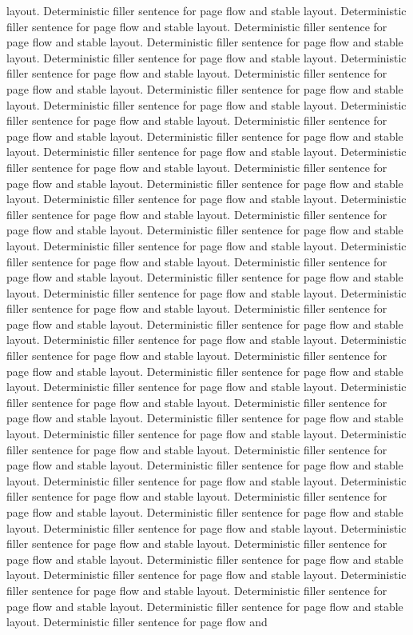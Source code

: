 \documentclass{article}
\begin{document}
layout. Deterministic filler sentence for page flow and stable layout. Deterministic filler sentence for page flow and stable layout. Deterministic filler sentence for page flow and stable layout. Deterministic filler sentence for page flow and stable layout. Deterministic filler sentence for page flow and stable layout. Deterministic filler sentence for page flow and stable layout. Deterministic filler sentence for page flow and stable layout. Deterministic filler sentence for page flow and stable layout. Deterministic filler sentence for page flow and stable layout. Deterministic filler sentence for page flow and stable layout. Deterministic filler sentence for page flow and stable layout. Deterministic filler sentence for page flow and stable layout. Deterministic filler sentence for page flow and stable layout. Deterministic filler sentence for page flow and stable layout. Deterministic filler sentence for page flow and stable layout. Deterministic filler sentence for page flow and stable layout. Deterministic filler sentence for page flow and stable layout. Deterministic filler sentence for page flow and stable layout. Deterministic filler sentence for page flow and stable layout. Deterministic filler sentence for page flow and stable layout. Deterministic filler sentence for page flow and stable layout. Deterministic filler sentence for page flow and stable layout. Deterministic filler sentence for page flow and stable layout. Deterministic filler sentence for page flow and stable layout. Deterministic filler sentence for page flow and stable layout. Deterministic filler sentence for page flow and stable layout. Deterministic filler sentence for page flow and stable layout. Deterministic filler sentence for page flow and stable layout. Deterministic filler sentence for page flow and stable layout. Deterministic filler sentence for page flow and stable layout. Deterministic filler sentence for page flow and stable layout. Deterministic filler sentence for page flow and stable layout. Deterministic filler sentence for page flow and stable layout. Deterministic filler sentence for page flow and stable layout. Deterministic filler sentence for page flow and stable layout. Deterministic filler sentence for page flow and stable layout. Deterministic filler sentence for page flow and stable layout. Deterministic filler sentence for page flow and stable layout. Deterministic filler sentence for page flow and stable layout. Deterministic filler sentence for page flow and stable layout. Deterministic filler sentence for page flow and stable layout. Deterministic filler sentence for page flow and stable layout. Deterministic filler sentence for page flow and stable layout. Deterministic filler sentence for page flow and stable layout. Deterministic filler sentence for page flow and stable layout. Deterministic filler sentence for page flow and stable layout. Deterministic filler sentence for page flow and stable layout. Deterministic filler sentence for page flow and stable layout. Deterministic filler sentence for page flow and stable layout. Deterministic filler sentence for page flow and stable layout. Deterministic filler sentence for page flow and stable layout. Deterministic filler sentence for page flow and stable layout. Deterministic filler sentence for page flow and 
\end{document}
